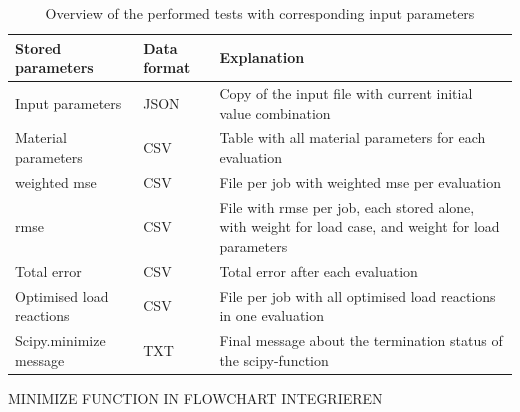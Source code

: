 \begin{table}[H]
    \centering
    \renewcommand{\arraystretch}{1.2}
    \caption{Overview of the performed tests with corresponding input parameters}
    \label{tab:storageData}
    \begin{tabular}{L{0.3\textwidth}|C{0.1\textwidth}L{0.5\textwidth}}
    \toprule
   \textbf{Stored parameters} & \textbf{Data format} & \textbf{Explanation}\\ \midrule
   Input parameters & JSON & Copy of the input file with current initial value combination\\ \hline
   Material parameters & CSV & Table with all material parameters for each evaluation\\\hline
   weighted \acrshort{mse} & CSV & File per job with weighted \acrshort{mse} per evaluation \\\hline
   \acrshort{rmse} & CSV & File with \acrshort{rmse} per job, each stored alone, with weight for load case, and weight for load parameters \\\hline
   Total error & CSV & Total error after each evaluation \\\hline
   Optimised load reactions & CSV & File per job with all optimised load reactions in one evaluation \\\hline
   Scipy.minimize message & TXT & Final message about the termination status of the scipy-function\\
    \bottomrule
    \end{tabular}
    
\end{table}

MINIMIZE FUNCTION IN FLOWCHART INTEGRIEREN




